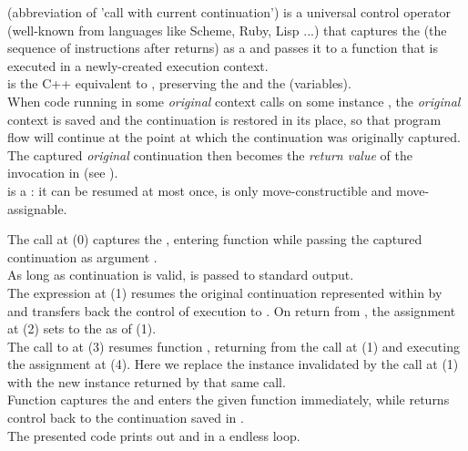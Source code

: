 \newpage
{}

\cc (abbreviation of 'call with current continuation') is a universal control
operator (well-known from languages like Scheme, Ruby, Lisp ...) that captures
the \currcont (the sequence of instructions after \cc returns) as a
 and passes it to a function that is
executed in a newly-created execution context.\\

\callcc is the C++ equivalent to \cc, preserving the  and the
 (variables).\\

When code running in some \emph{original} context calls \resume on some \cont
instance , the \emph{original} context is saved and
the  continuation is restored in its place, so that program flow
will continue at the point at which the  continuation was
originally captured. The captured \emph{original} continuation then becomes
the \emph{return value} of the \callcc invocation in 
(see ).\\

\cont is a : it can be resumed at most once, is only
move-constructible and move-assignable.

The  call at (0) captures the \currcont, entering function
 while passing the captured continuation as argument .\\
As long as continuation  is valid,  is passed to standard
output.\\
The expression  at (1) resumes the original
continuation represented within  by  and transfers back the
control of execution to . On return from ,
the assignment at (2) sets  to the \currcont as of (1).\\
The call to  at (3)
resumes function , returning from the \resume call at (1) and executing
the assignment at (4). Here we replace the \cont instance 
invalidated by the \resume call at (1) with the new instance returned by that
same \resume call.\\
Function \callcc captures the \currcont and enters the given function immediately,
while \resume returns control back to the continuation saved in .\\
The presented code prints out  and  in a endless loop.\\


